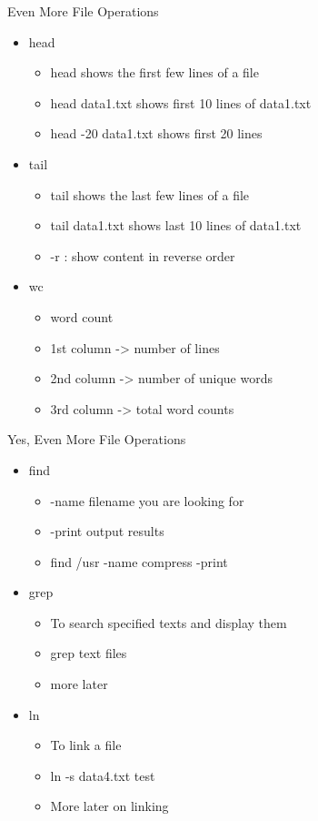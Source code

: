 \documentclass{beamer}
\begin{document}
\begin{frame}{Even More File Operations}
\begin{itemize}
\item head
\begin{itemize}
\item head shows the first few lines of a file
\item head data1.txt shows first 10 lines of data1.txt
\item head -20 data1.txt shows first 20 lines
\end{itemize}
\item tail
\begin{itemize}
\item tail shows the last few lines of a file
\item tail data1.txt shows last 10 lines of data1.txt
\item -r : show content in reverse order
\end{itemize}
\item wc
\begin{itemize}
\item word count
\item 1st column -> number of lines
\item 2nd column -> number of unique words
\item 3rd column -> total word counts
\end{itemize}
\end{itemize}
\end{frame}

\begin{frame}{Yes, Even More File Operations}
\begin{itemize}
\item find
\begin{itemize}
\item -name	filename you are looking for
\item -print	output results
\item find /usr -name compress -print
\end{itemize}
\item grep
\begin{itemize}
\item To search specified texts and display them
\item grep text files
\item more later
\end{itemize}
\item ln
\begin{itemize}
\item To link a file
\item ln -s data4.txt test
\item More later on linking
\end{itemize}
\end{itemize}
\end{frame}
\end{document}
